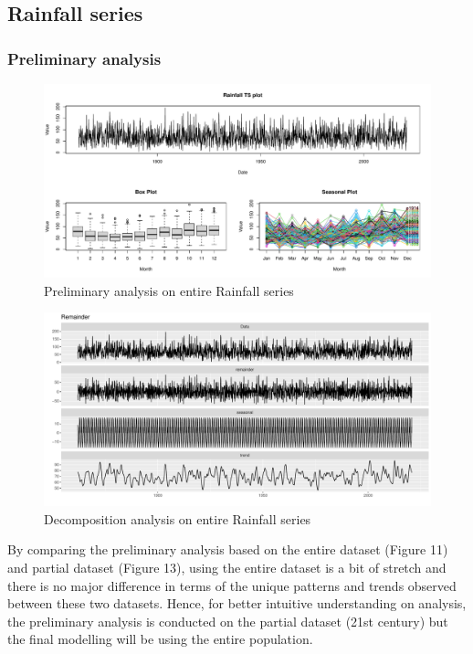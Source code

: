 \documentclass[
  11pt,
]{article}
\begin{document}
\newpage
\newpage
\newpage

\hypertarget{rainfall-series}{%
\subsection{Rainfall series}\label{rainfall-series}}

\hypertarget{preliminary-analysis-1}{%
\subsubsection{Preliminary analysis}\label{preliminary-analysis-1}}

\begin{figure}
\centering
\includegraphics{ST422_files/figure-latex/unnamed-chunk-18-1.pdf}
\caption{Preliminary analysis on entire Rainfall series}
\end{figure}

\begin{figure}
\centering
\includegraphics{ST422_files/figure-latex/unnamed-chunk-19-1.pdf}
\caption{Decomposition analysis on entire Rainfall series}
\end{figure}

By comparing the preliminary analysis based on the entire dataset
(Figure 11) and partial dataset (Figure 13), using the entire dataset is
a bit of stretch and there is no major difference in terms of the unique
patterns and trends observed between these two datasets. Hence, for
better intuitive understanding on analysis, the preliminary analysis is
conducted on the partial dataset (21st century) but the final modelling
will be using the entire population.
\end{document}
